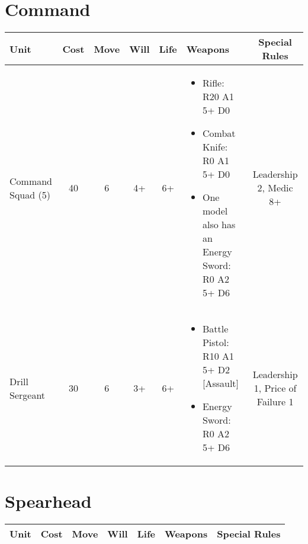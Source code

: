 \documentclass[landscape]{extarticle}
\begin{document}
\begin{small}

\section*{Command}

\begin{tabular}{UccccWS}

\textbf{Unit} & \textbf{Cost} & \textbf{Move} & \textbf{Will} & \textbf{Life} & \textbf{Weapons} & \textbf{Special Rules} \\


\hline


Command Squad (5)
&
40
&
6
&
4+
&
6+
&
\begin{itemize}
    \item Rifle: R20 A1 5+ D0
    \item Combat Knife: R0 A1 5+ D0
    \item One model also has an Energy Sword: R0 A2 5+ D6
\end{itemize}
&
Leadership 2, Medic 8+



\\



Drill Sergeant 
&
30
&
6
&
3+
&
6+
&
\begin{itemize}
    \item Battle Pistol: R10 A1 5+ D2 [Assault]
    \item Energy Sword: R0 A2 5+ D6
\end{itemize}
&
Leadership 1, Price of Failure 1

\end{tabular}








\section*{Spearhead}

\begin{tabular}{UccccWS}

\textbf{Unit} & \textbf{Cost} & \textbf{Move} & \textbf{Will} & \textbf{Life} & \textbf{Weapons} & \textbf{Special Rules} \\


\hline



\end{tabular}
\end{small}
\end{document}
